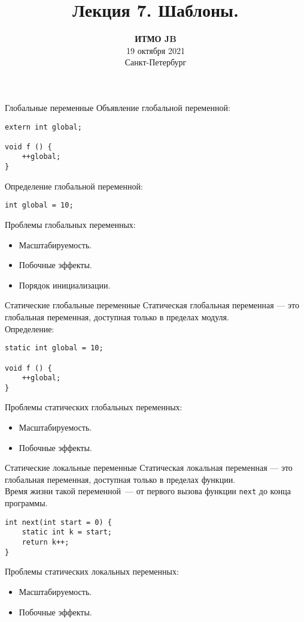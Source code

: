 \documentclass{beamer}
\title{Лекция 7. Шаблоны.}
\date{
   \textbf{ИТМО JB}\\
   19 октября 2021 \\
   Санкт-Петербург
}
\begin{document}
\begin{frame} 
  \titlepage
\end{frame}

\begin{frame}[fragile]{Глобальные переменные}
Объявление глобальной переменной:
    \begin{lstlisting}
extern int global;

void f () {
    ++global; 
}
    \end{lstlisting}

Определение глобальной переменной:
    \begin{lstlisting}
int global = 10;
    \end{lstlisting}

Проблемы глобальных переменных:
\begin{itemize}
    \item Масштабируемость.
    \item Побочные эффекты.
    \item Порядок инициализации.
\end{itemize}
\end{frame}

\begin{frame}[fragile]{Статические глобальные переменные}
    Статическая глобальная переменная — это глобальная переменная,
    доступная только в пределах модуля.\\[1em]
Определение: 
    \begin{lstlisting}
static int global = 10;

void f () {
    ++global; 
}
    \end{lstlisting}
                
Проблемы статических глобальных переменных:
\begin{itemize}
    \item Масштабируемость.
    \item Побочные эффекты.
\end{itemize}
\end{frame}

\begin{frame}[fragile]{Статические локальные переменные}
    Статическая локальная переменная — это глобальная переменная,
    доступная только в пределах функции.\\[1em]
Время жизни такой переменной~--- от первого вызова функции {\tt next}
до конца программы.
    \begin{lstlisting}
int next(int start = 0) {
    static int k = start;
    return k++;
}
    \end{lstlisting}
                
Проблемы статических локальных переменных:
\begin{itemize}
    \item Масштабируемость.
    \item Побочные эффекты.
\end{itemize}
\end{frame}
\end{document}
